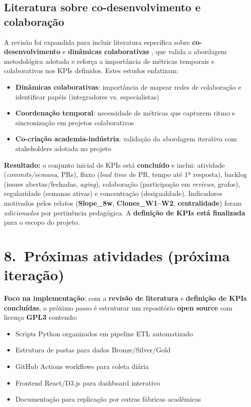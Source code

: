 \documentclass[
	12pt,
	openright,
	oneside,
	a4paper,
	brazil
]{abntex2}
\begin{document}
\subsection{Literatura sobre co-desenvolvimento e colaboração}
A revisão foi expandida para incluir literatura específica sobre \textbf{co-desenvolvimento} e \textbf{dinâmicas colaborativas} \cite{jarvela2018collaboration,franssen2019cogs,bjerregaard2021lessons}, que valida a abordagem metodológica adotada e reforça a importância de métricas temporais e colaborativas nos KPIs definidos. Estes estudos enfatizam:
\begin{itemize}
\item \textbf{Dinâmicas colaborativas}: importância de mapear redes de colaboração e identificar papéis (integradores vs. especialistas)
\item \textbf{Coordenação temporal}: necessidade de métricas que capturem ritmo e sincronização em projetos colaborativos
\item \textbf{Co-criação academia-indústria}: validação da abordagem iterativa com stakeholders adotada no projeto
\end{itemize}


\noindent \textbf{Resultado:} o conjunto inicial de KPIs está \textbf{concluído} e inclui: atividade (\emph{commits/semana}, PRs), fluxo (\emph{lead time} de PR, tempo até 1ª resposta), backlog (issues abertas/fechadas, \emph{aging}), colaboração (participação em \emph{reviews}, grafos), regularidade (semanas ativas) e concentração (desigualdade). Indicadores motivados pelos relatos (\textbf{Slope\_8w}, \textbf{Clones\_W1--W2}, \textbf{centralidade}) foram \emph{adicionados} por pertinência pedagógica. A \textbf{definição de KPIs está finalizada} para o escopo do projeto.

\section*{8.\ Próximas atividades (próxima iteração)}
\textbf{Foco na implementação}: com a \textbf{revisão de literatura} e \textbf{definição de KPIs concluídas}, o próximo passo é estruturar um repositório \textbf{open source} com licença \textbf{GPL3} contendo:
\begin{itemize}
    \item Scripts Python organizados em pipeline ETL automatizado
    \item Estrutura de pastas para dados Bronze/Silver/Gold  
    \item GitHub Actions workflows para coleta diária
    \item Frontend React/D3.js para dashboard interativo
    \item Documentação para replicação por outras fábricas acadêmicas
\end{itemize}
\end{document}
